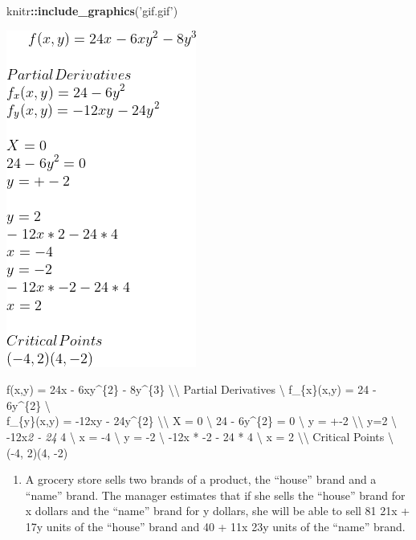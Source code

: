\documentclass[
]{article}
\newenvironment{Shaded}{\begin{snugshade}}{\end{snugshade}}
\newcommand{\KeywordTok}[1]{\textcolor[rgb]{0.13,0.29,0.53}{\textbf{#1}}}
\newcommand{\NormalTok}[1]{#1}
\newcommand{\OperatorTok}[1]{\textcolor[rgb]{0.81,0.36,0.00}{\textbf{#1}}}
\newcommand{\StringTok}[1]{\textcolor[rgb]{0.31,0.60,0.02}{#1}}
\providecommand{\tightlist}{%
  \setlength{\itemsep}{0pt}\setlength{\parskip}{0pt}}
\begin{document}
\begin{Shaded}
\begin{Highlighting}[]
\NormalTok{knitr}\OperatorTok{::}\KeywordTok{include_graphics}\NormalTok{(}\StringTok{'gif.gif'}\NormalTok{)}
\end{Highlighting}
\end{Shaded}

\includegraphics{gif.gif}

f(x,y) = 24x - 6xy\^{}\{2\} - 8y\^{}\{3\} \textbackslash\textbackslash{}
Partial Derivatives \textbackslash{} f\_\{x\}(x,y) = 24 - 6y\^{}\{2\}
\textbackslash{}\\
f\_\{y\}(x,y) = -12xy - 24y\^{}\{2\} \textbackslash\textbackslash{} X =
0 \textbackslash{} 24 - 6y\^{}\{2\} = 0 \textbackslash{} y = +-2
\textbackslash\textbackslash{} y=2 \textbackslash{} -12x\emph{2 - 24 } 4
\textbackslash{} x = -4 \textbackslash{} y = -2 \textbackslash{} -12x *
-2 - 24 * 4 \textbackslash{} x = 2 \textbackslash\textbackslash{}
Critical Points \textbackslash{} (-4, 2)(4, -2)

\begin{enumerate}
\def\labelenumi{\arabic{enumi}.}
\setcounter{enumi}{2}
\tightlist
\item
  A grocery store sells two brands of a product, the ``house'' brand and
  a ``name'' brand. The manager estimates that if she sells the
  ``house'' brand for x dollars and the ``name'' brand for y dollars,
  she will be able to sell 81 21x + 17y units of the ``house'' brand and
  40 + 11x 23y units of the ``name'' brand.
\end{enumerate}
\end{document}
